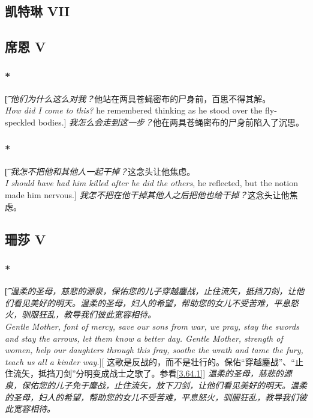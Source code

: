 \documentclass[12pt,a4paper]{article}
\begin{document}
\subsection{凯特琳 VII}

\subsection{席恩 V}
\subsubsection{\color{red}*}\t[
	\emph{他们为什么这么对我？}他站在两具苍蝇密布的尸身前，百思不得其解。\\
	\emph{How did I come to this?} he remembered thinking as he stood over the fly-speckled bodies.]
	\emph{我怎么会走到这一步？}他在两具苍蝇密布的尸身前陷入了沉思。
	
\subsubsection{\color{red}*}\t[
	\emph{我怎不把他和其他人一起干掉？}这念头让他焦虑。\\
	\emph{I should have had him killed after he did the others}, he reflected, but the notion made him nervous.]
	\emph{我怎不把在他干掉其他人之后把他也给干掉？}这念头让他焦虑。
	
\subsection{珊莎 V}
\subsubsection{\color{red}*}\label{2.57.1}\t[
	\emph{温柔的圣母，慈悲的源泉，保佑您的儿子穿越鏖战，止住流矢，抵挡刀剑，让他们看见美好的明天。温柔的圣母，妇人的希望，帮助您的女儿不受苦难，平息怒火，驯服狂乱，教导我们彼此宽容相待。\\
	Gentle Mother, font of mercy, save our sons from war, we pray, stay the swords and stay the arrows, let them know a better day. Gentle Mother, strength of women, help our daughters through this fray, soothe the wrath and tame the fury, teach us all a kinder way.}][
	这歌是反战的，而不是壮行的。保佑“穿越鏖战”、“止住流矢，抵挡刀剑”分明变成战士之歌了。参看\ref{3.64.1}]
	\emph{温柔的圣母，慈悲的源泉，保佑您的儿子免于鏖战，止住流矢，放下刀剑，让他们看见美好的明天。温柔的圣母，妇人的希望，帮助您的女儿不受苦难，平息怒火，驯服狂乱，教导我们彼此宽容相待。}
	
\end{document}
